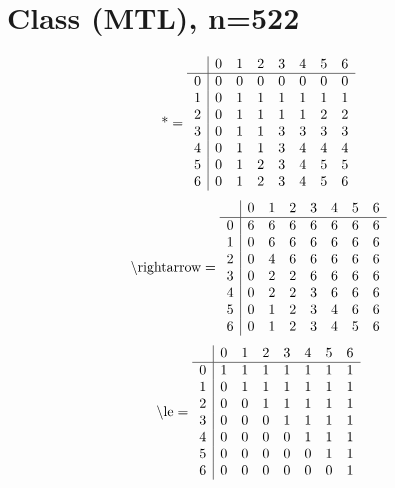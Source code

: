 \documentclass[11pt]{article}
\begin{document}
\section{Class (MTL), n=522}
\[\text{*} = 
\begin{array}{r | r r r r r r r}
 & 0 & 1 & 2 & 3 & 4 & 5 & 6 \\ \hline
0 & 0 & 0 & 0 & 0 & 0 & 0 & 0 \\
1 & 0 & 1 & 1 & 1 & 1 & 1 & 1 \\
2 & 0 & 1 & 1 & 1 & 1 & 2 & 2 \\
3 & 0 & 1 & 1 & 3 & 3 & 3 & 3 \\
4 & 0 & 1 & 1 & 3 & 4 & 4 & 4 \\
5 & 0 & 1 & 2 & 3 & 4 & 5 & 5 \\
6 & 0 & 1 & 2 & 3 & 4 & 5 & 6 \\
\end{array}
\]
\[\text{\textbackslash rightarrow} = 
\begin{array}{r | r r r r r r r}
 & 0 & 1 & 2 & 3 & 4 & 5 & 6 \\ \hline
0 & 6 & 6 & 6 & 6 & 6 & 6 & 6 \\
1 & 0 & 6 & 6 & 6 & 6 & 6 & 6 \\
2 & 0 & 4 & 6 & 6 & 6 & 6 & 6 \\
3 & 0 & 2 & 2 & 6 & 6 & 6 & 6 \\
4 & 0 & 2 & 2 & 3 & 6 & 6 & 6 \\
5 & 0 & 1 & 2 & 3 & 4 & 6 & 6 \\
6 & 0 & 1 & 2 & 3 & 4 & 5 & 6 \\
\end{array}
\]
\[\text{\textbackslash le} = 
\begin{array}{r | r r r r r r r}
 & 0 & 1 & 2 & 3 & 4 & 5 & 6 \\ \hline
0 & 1 & 1 & 1 & 1 & 1 & 1 & 1 \\
1 & 0 & 1 & 1 & 1 & 1 & 1 & 1 \\
2 & 0 & 0 & 1 & 1 & 1 & 1 & 1 \\
3 & 0 & 0 & 0 & 1 & 1 & 1 & 1 \\
4 & 0 & 0 & 0 & 0 & 1 & 1 & 1 \\
5 & 0 & 0 & 0 & 0 & 0 & 1 & 1 \\
6 & 0 & 0 & 0 & 0 & 0 & 0 & 1 \\
\end{array}
\]
\end{document}
